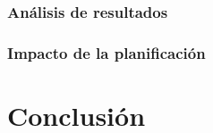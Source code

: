 \documentclass[12pt]{article}
\newcommand\blankpage{%
    \null
    \thispagestyle{empty}%
    \addtocounter{page}{-1}%
    \newpage}
\begin{document}
        \subsubsection{Análisis de resultados}
        \subsubsection{Impacto de la planificación}
    \newpage
    \section{Conclusión}
    \noindent
    \newpage
    \blankpage
\end{document}
